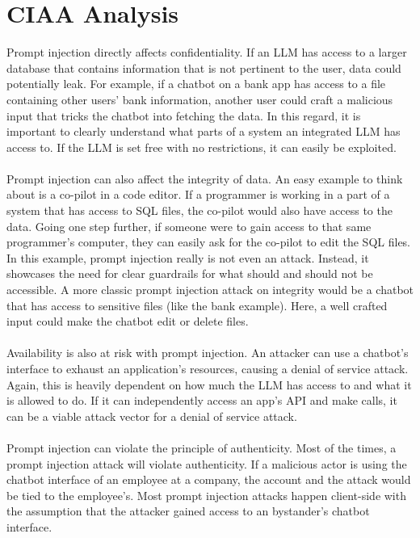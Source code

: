 \documentclass[11pt]{article}
\begin{document}
\section{CIAA Analysis}
Prompt injection directly affects confidentiality. If an LLM has access to a larger database that contains information that is not pertinent to the user, data could potentially leak. For example, if a chatbot on a bank app has access to a file containing other users' bank information, another user could craft a malicious input that tricks the chatbot into fetching the data. In this regard, it is important to clearly understand what parts of a system an integrated LLM has access to. If the LLM is set free with no restrictions, it can easily be exploited. 
\\
\\
Prompt injection can also affect the integrity of data. An easy example to think about is a co-pilot in a code editor. If a programmer is working in a part of a system that has access to SQL files, the co-pilot would also have access to the data. Going one step further, if someone were to gain access to that same programmer's computer, they can easily ask for the co-pilot to edit the SQL files. In this example, prompt injection really is not even an attack. Instead, it showcases the need for clear guardrails for what should and should not be accessible. A more classic prompt injection attack on integrity would be a chatbot that has access to sensitive files (like the bank example). Here, a well crafted input could make the chatbot edit or delete files. 
\\
\\
Availability is also at risk with prompt injection. An attacker can use a chatbot's interface to exhaust an application's resources, causing a denial of service attack. Again, this is heavily dependent on how much the LLM has access to and what it is allowed to do. If it can independently access an app's API and make calls, it can be a viable attack vector for a denial of service attack. 
\\
\\
Prompt injection can violate the principle of authenticity. Most of the times, a prompt injection attack will violate authenticity. If a malicious actor is using the chatbot interface of an employee at a company, the account and the attack would be tied to the employee's. Most prompt injection attacks happen client-side with the assumption that the attacker gained access to an bystander's chatbot interface. 
\end{document}

